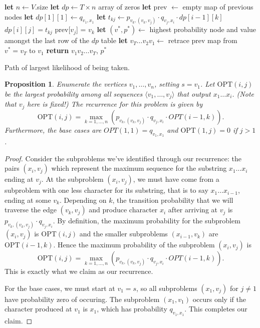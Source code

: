 \documentclass[10pt]{article}
\newtheorem{proposition}[lemma]{Proposition}
\newcommand{\OPT}{\text{OPT}}
\begin{document}
\begin{algorithm}[htb]
  \begin{algorithmic}
    \STATE \textbf{let} \(n \gets V\).size
    \STATE \textbf{let} \(dp \gets T \times n\) array of zeros
    \STATE \textbf{let} prev \(\gets\) empty map of previous nodes
    \STATE \textbf{let} \(dp[1][1] \gets q_{v_1, x_1}\)
          \STATE \textbf{let} \(t_{kj} \gets p_{v_k, (v_k, v_j)} \cdot q_{v_j, x_i} \cdot dp[i - 1][k]\)
            \STATE \(dp[i][j] = t_{kj}\)
            \STATE prev[\(v_j\)] = \(v_k\)
          \ENDIF
        \ENDFOR
      \ENDFOR
    \ENDFOR
    \STATE \textbf{let} \((v^*, p^*) \gets\) highest probability node and value amongst the last row of the \(dp\) table
    \STATE \textbf{let} \(v_T \ldots v_2 v_1 \gets\) retrace prev map from \(v^* = v_T\) to \(v_1\)
    \STATE \textbf{return} \(v_1 v_2 \ldots v_T\), \(p^*\)
  \end{algorithmic}
\caption{Path of largest likelihood of being taken. \label{alg:most-probable-path}}
\end{algorithm}

\begin{proposition}
  Enumerate the vertices \(v_1, \ldots, v_n\), setting \(s = v_1\). Let \(\OPT(i, j)\) be the largest probability among all sequences \(\langle v_1, \ldots, v_j\rangle\) that output \(x_1 \ldots x_i\). (Note that \(v_j\) here is fixed!) The recurrence for this problem is given by 
  \[\OPT(i, j) = \max_{k = 1, \ldots, n}(p_{v_k, (v_k, v_j)} \cdot q_{v_j, x_i} \cdot OPT(i - 1, k)).\]
  Furthermore, the base cases are \(OPT(1, 1) = q_{v_1, x_1}\) and \(\OPT(1, j) = 0\) if \(j > 1\).
\end{proposition}

\begin{proof}
  Consider the subproblems we've identified through our recurrence: the pairs \((x_i, v_j)\) which represent the maximum sequence for the substring \(x_1 \ldots x_i\) ending at \(v_j\). At the subproblem \((x_i, v_j)\), we must have come from a subproblem with one less character for its substring, that is to say \(x_1 \ldots x_{i - 1}\), ending at some \(v_k\). Depending on \(k\), the transition probability that we will traverse the edge \((v_k, v_j)\) and produce character \(x_i\) after arriving at \(v_j\) is \(p_{v_k, (v_k, v_j)} \cdot q_{v_j, x_i}\). By definition, the maximum probability for the subproblem \((x_i, v_j)\) is \(\OPT(i, j)\) and the smaller subproblems \((x_{i- 1}, v_k)\) are \(\OPT(i - 1, k)\). Hence the maximum probability of the subproblem \((x_i, v_j)\) is 
  \[\OPT(i, j) = \max_{k = 1, \ldots, n}\left(p_{v_k, (v_k, v_j)} \cdot q_{v_j, x_i} \cdot OPT(i - 1, k)\right).\]
  This is exactly what we claim as our recurrence. 
  
  For the base cases, we must start at \(v_1 = s\), so all subproblems \((x_1, v_j)\) for \(j \neq 1\) have probability zero of occuring. The subproblem \((x_1, v_1)\) occurs only if the character produced at \(v_1\) is \(x_1\), which has probability \(q_{v_1, x_1}\). This completes our claim.
\end{proof}
\end{document}

